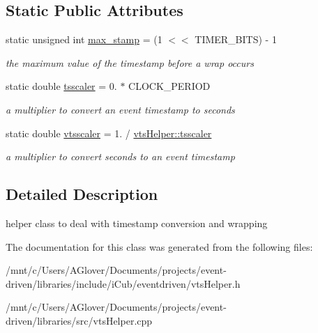 \subsection*{Static Public Attributes}
\begin{DoxyCompactItemize}
\item 
\mbox{\label{classev_1_1vtsHelper_a059fdcf455b471e69446e565ed017f65}} 
static unsigned int \hyperlink{classev_1_1vtsHelper_a059fdcf455b471e69446e565ed017f65}{max\+\_\+stamp} = (1 $<$$<$ T\+I\+M\+E\+R\+\_\+\+B\+I\+TS) -\/ 1
\begin{DoxyCompactList}\small\item\em the maximum value of the timestamp before a wrap occurs \end{DoxyCompactList}\item 
\mbox{\label{classev_1_1vtsHelper_ad3ad427d18c24f9655bbc73295abf678}} 
static double \hyperlink{classev_1_1vtsHelper_ad3ad427d18c24f9655bbc73295abf678}{tsscaler} = 0. $\ast$ C\+L\+O\+C\+K\+\_\+\+P\+E\+R\+I\+OD
\begin{DoxyCompactList}\small\item\em a multiplier to convert an event timestamp to seconds \end{DoxyCompactList}\item 
\mbox{\label{classev_1_1vtsHelper_afa2dd46ae7113668bc6ebea88ab8fa11}} 
static double \hyperlink{classev_1_1vtsHelper_afa2dd46ae7113668bc6ebea88ab8fa11}{vtsscaler} = 1. / \hyperlink{classev_1_1vtsHelper_ad3ad427d18c24f9655bbc73295abf678}{vts\+Helper\+::tsscaler}
\begin{DoxyCompactList}\small\item\em a multiplier to convert seconds to an event timestamp \end{DoxyCompactList}\end{DoxyCompactItemize}


\subsection{Detailed Description}
helper class to deal with timestamp conversion and wrapping 

The documentation for this class was generated from the following files\+:\begin{DoxyCompactItemize}
\item 
/mnt/c/\+Users/\+A\+Glover/\+Documents/projects/event-\/driven/libraries/include/i\+Cub/eventdriven/vts\+Helper.\+h\item 
/mnt/c/\+Users/\+A\+Glover/\+Documents/projects/event-\/driven/libraries/src/vts\+Helper.\+cpp\end{DoxyCompactItemize}
